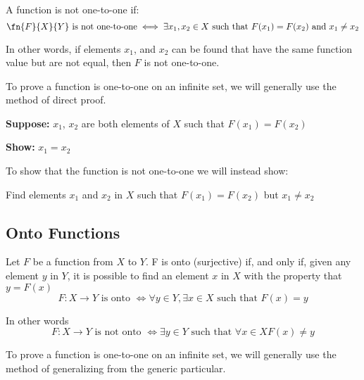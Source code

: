 \documentclass[11pt]{article}
\begin{document}
\begin{definition}\label{def:det-one-to-one}
    A function is not one-to-one if:
    \begin{equation*}
        \fn{F}{X}{Y} \text{ is not one-to-one} \iff \exists x_1,x_2 \in X \text{ such that } F(x_1) = F(x_2) \text{ and } x_1 \neq x_2
    \end{equation*}

    In other words, if elements $x_1$, and $x_2$ can be found that have
    the same function value but are not equal, then $F$ is not one-to-one.
\end{definition}

To prove a function is one-to-one on an infinite set, we will generally use the method of direct proof.

\begin{definition}\label{def:prove-one-to-one}
    \textbf{Suppose:} $x_1$, $x_2$ are both elements of $X$ such that $F(x_1) = F(x_2)$

    \textbf{Show:} $x_1 = x_2$

    To show that the function is not one-to-one we will instead show:

     Find elements $x_1$ and $x_2$ in $X$ such that $F(x_1) = F(x_2)$ but $x_1 \neq x_2$
\end{definition}

\subsection{Onto Functions}
\begin{definition}[Onto]\label{def:onto}
    Let $F$ be a function from $X$ to $Y$. F is onto (surjective) if, and only if,
    given any element $y$ in $Y$, it is possible to find an element $x$ in $X$ with
    the property that $y = F(x)$
    \begin{equation*}
        F\colon X \to Y \text{ is onto } \iff \forall y \in Y, \exists x \in X \text{ such that } F(x) = y
    \end{equation*}

    In other words
    \begin{equation*}
        F\colon X \to Y \text{ is not onto } \iff \exists y \in Y \text{ such that } \forall x \in X F(x) \neq y
    \end{equation*}
\end{definition}

To prove a function is one-to-one on an infinite set, we will generally use the method of generalizing from the generic particular.
\end{document}
